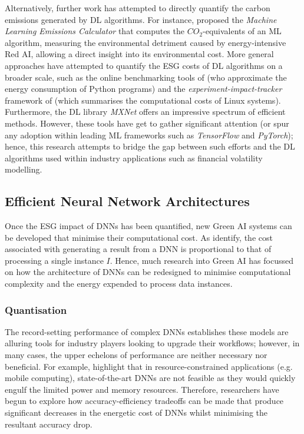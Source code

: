 \documentclass[a4paper, 11pt]{report}
\begin{document}
    Alternatively, further work has attempted to directly quantify the carbon emissions generated by DL algorithms. For instance, \citet{lacoste-2019} proposed the \emph{Machine Learning Emissions Calculator} that computes the $CO_2$-equivalents of an ML algorithm, measuring the environmental detriment caused by energy-intensive Red AI, allowing a direct insight into its environmental cost. More general approaches have attempted to quantify the ESG costs of DL algorithms on a broader scale, such as the online benchmarking tools of \citet{lottick-2019} (who approximate the energy consumption of Python programs) and the \emph{experiment-impact-tracker} framework of \citet{henderson-2020} (which summarises the computational costs of Linux systems). Furthermore, the DL library \emph{MXNet} \citep{chen-2015} offers an impressive spectrum of efficient methods. However, these tools have get to gather significant attention (or spur any adoption within leading ML frameworks such as \emph{TensorFlow} and \emph{PyTorch}); hence, this research attempts to bridge the gap between such efforts and the DL algorithms used within industry applications such as financial volatility modelling.


    \subsection{Efficient Neural Network Architectures}

    Once the ESG impact of DNNs has been quantified, new Green AI systems can be developed that minimise their computational cost. As \citet{schwartz-2019} identify, the cost associated with generating a result from a DNN is proportional to that of processing a single instance $I$. Hence, much research into Green AI has focussed on how the architecture of DNNs can be redesigned to minimise computational complexity and the energy expended to process data instances. 


    \subsubsection{Quantisation}
    \label{section: quantisation}

    The record-setting performance of complex DNNs establishes these models are alluring tools for industry players looking to upgrade their workflows; however, in many cases, the upper echelons of performance are neither necessary nor beneficial. For example, \citet{kumar-2020} highlight that in resource-constrained applications (e.g. mobile computing), state-of-the-art DNNs are not feasible as they would quickly engulf the limited power and memory resources. Therefore, researchers have begun to explore how accuracy-efficiency tradeoffs can be made that produce significant decreases in the energetic cost of DNNs whilst minimising the resultant accuracy drop.
    
\end{document}
